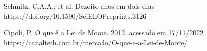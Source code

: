 \documentclass[
12pt,		%
openright,	%
twoside,  %
a4paper,			%
chapter=TITLE,		%
english,			%
french,				%
spanish,			%
brazil				%
]{USPSC-classe/USPSC}
\begin{document}
\begin{flushleft}
\begin{flushleft}
\begin{flushleft}
\begin{flushleft}
\begin{flushleft}
\begin{flushleft}
\begin{flushleft}
\begin{flushleft}
\begin{flushleft}
[Schmitz et al., 2021] Schmitz, C.A.A.; et al. Dezoito anos em dois dias, https://doi.org/10.1590/SciELOPreprints.3126
\end{flushleft}


\end{flushleft}


\end{flushleft}


\end{flushleft}


\end{flushleft}


\end{flushleft}


\end{flushleft}


\end{flushleft}


\end{flushleft}


\begin{flushleft}
\begin{flushleft}
\begin{flushleft}
\begin{flushleft}
\begin{flushleft}
\begin{flushleft}
\begin{flushleft}
\begin{flushleft}
\begin{flushleft}
[CIPOLI, 2012] Cipoli, P. O que \'e a Lei de Moore, 2012, acessado em 17/11/2022 https://canaltech.com.br/mercado/O-que-e-a-Lei-de-Moore/
\end{flushleft}


\end{flushleft}


\end{flushleft}


\end{flushleft}


\end{flushleft}


\end{flushleft}


\end{flushleft}


\end{flushleft}


\end{flushleft}
\end{document}
